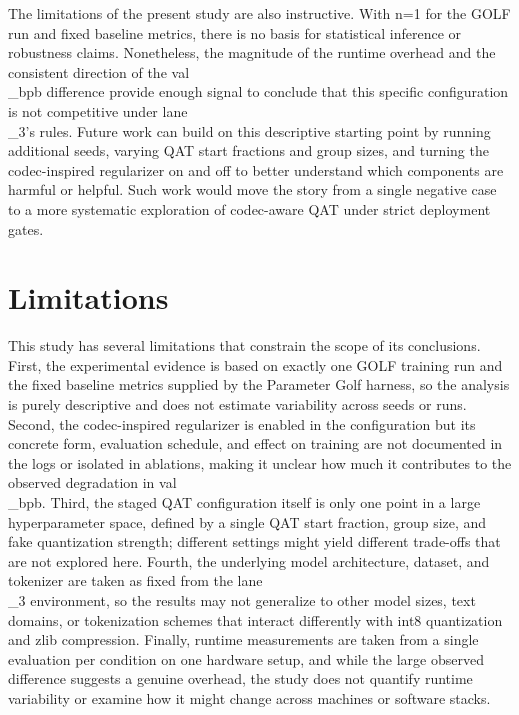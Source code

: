 \documentclass{article}
\begin{document}
The limitations of the present study are also instructive. With n=1 for the GOLF run and fixed baseline metrics, there is no basis for statistical inference or robustness claims. Nonetheless, the magnitude of the runtime overhead and the consistent direction of the val\\_bpb difference provide enough signal to conclude that this specific configuration is not competitive under lane\\_3's rules. Future work can build on this descriptive starting point by running additional seeds, varying QAT start fractions and group sizes, and turning the codec-inspired regularizer on and off to better understand which components are harmful or helpful. Such work would move the story from a single negative case to a more systematic exploration of codec-aware QAT under strict deployment gates.

\section{Limitations}

\label{sec:limitations}

This study has several limitations that constrain the scope of its conclusions. First, the experimental evidence is based on exactly one GOLF training run and the fixed baseline metrics supplied by the Parameter Golf harness, so the analysis is purely descriptive and does not estimate variability across seeds or runs. Second, the codec-inspired regularizer is enabled in the configuration but its concrete form, evaluation schedule, and effect on training are not documented in the logs or isolated in ablations, making it unclear how much it contributes to the observed degradation in val\\_bpb. Third, the staged QAT configuration itself is only one point in a large hyperparameter space, defined by a single QAT start fraction, group size, and fake quantization strength; different settings might yield different trade-offs that are not explored here. Fourth, the underlying model architecture, dataset, and tokenizer are taken as fixed from the lane\\_3 environment, so the results may not generalize to other model sizes, text domains, or tokenization schemes that interact differently with int8 quantization and zlib compression. Finally, runtime measurements are taken from a single evaluation per condition on one hardware setup, and while the large observed difference suggests a genuine overhead, the study does not quantify runtime variability or examine how it might change across machines or software stacks.
\end{document}
